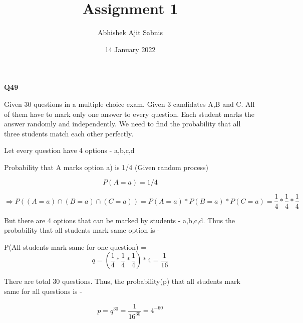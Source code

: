 \documentclass{article}
\title{\textbf{Assignment 1}}
\author{Abhishek Ajit Sabnis}
\date{14 January 2022}
\begin{document}
\maketitle
\begin{center}
{\textbf{\Large Q49 }}
\end{center}

Given 30 questions in a multiple choice exam. Given 3 candidates A,B and C. All of them have to mark only one answer to every question. Each student marks the answer randomly and independently. We need to find the probability that all three students match each other perfectly.

Let every question have 4 options - a,b,c,d
\vspace{0.5cm}

Probability that A marks option a) is 1/4 (Given random process)

\begin{equation}
    P(A=a) = 1/4
\end{equation}

\begin{equation}
    \Rightarrow P((A=a) \cap (B=a) \cap (C=a)) = P(A=a) * P(B=a) * P(C=a)  
 = \frac{1}{4} * \frac{1}{4} * \frac{1}{4}
\end{equation}

But there are 4 options that can be marked by students - a,b,c,d. Thus the probability that all students mark same option is - 
\vspace{0.5cm}

P(All students mark same for one question) = 
\begin{equation}
    q = (\frac{1}{4} * \frac{1}{4} * \frac{1}{4}) *4 = \frac{1}{16}
\end{equation}

There are total 30 questions. Thus, the probability(p) that all students mark same for all questions is - 

\begin{equation}
     p = q^{30} = \frac{1}{16^{30}} = 4^{-60}
\end{equation}
\end{document}
